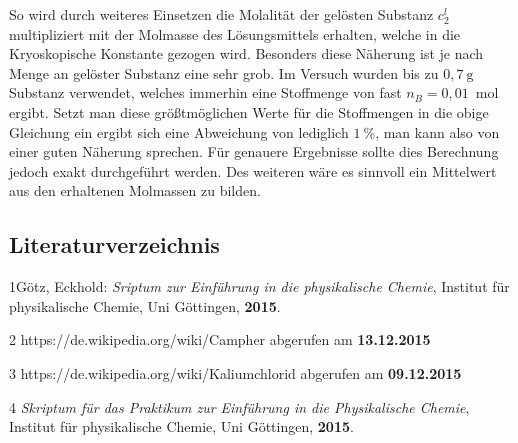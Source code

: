 \documentclass[12pt,a4paper,titlepage,headinclude,bibtotoc]{scrartcl}
\begin{document}
So wird durch weiteres Einsetzen die Molalität der gelösten Substanz $c_2^l$ multipliziert mit der Molmasse des Lösungsmittels erhalten, welche in die Kryoskopische Konstante gezogen wird. Besonders diese Näherung ist je nach Menge an gelöster Substanz eine sehr grob. Im Versuch wurden bis zu $0,7{~}\mathrm{g}$ Substanz verwendet, welches immerhin eine Stoffmenge von fast $n_B = 0,01${~}mol ergibt. Setzt man diese größtmöglichen Werte für die Stoffmengen in die obige Gleichung ein ergibt sich eine Abweichung von lediglich $1 {~} \% $, man kann also von einer guten Näherung sprechen. Für genauere Ergebnisse sollte dies Berechnung jedoch exakt durchgeführt werden. Des weiteren wäre es sinnvoll ein Mittelwert aus den erhaltenen Molmassen zu bilden.  
 


 














\newpage



\subsection{Literaturverzeichnis}
1\quad Götz, Eckhold: \emph{Sriptum zur Einführung in die physikalische Chemie}, Institut für physikalische Chemie, Uni Göttingen, \textbf{2015}.

\vspace{0,5 cm}

2 \quad https://de.wikipedia.org/wiki/Campher abgerufen am \textbf{13.12.2015}

\vspace{5cm}

3 \quad https://de.wikipedia.org/wiki/Kaliumchlorid abgerufen am \textbf{09.12.2015}

\vspace{5cm}

4 \quad \emph{Skriptum für das Praktikum zur Einführung in die Physikalische Chemie}, Institut für physikalische Chemie, Uni Göttingen, \textbf{2015}.\\
\end{document}
